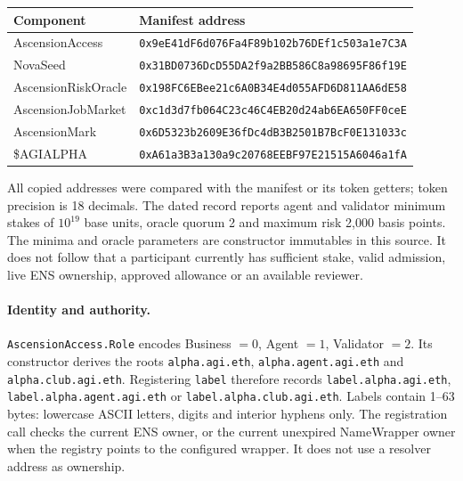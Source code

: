 \documentclass[11pt,letterpaper]{article}
\begin{document}
\begin{center}\small
\begin{tabular}{@{}ll@{}}
\toprule Component & Manifest address\\\midrule
AscensionAccess & \texttt{0x9eE41dF6d076Fa4F89b102b76DEf1c503a1e7C3A}\\
NovaSeed & \texttt{0x31BD0736DcD55DA2f9a2BB586C8a98695F86f19E}\\
AscensionRiskOracle & \texttt{0x198FC6EBee21c6A0B34E4d055AFD6D811AA6dE58}\\
AscensionJobMarket & \texttt{0xc1d3d7fb064C23c46C4EB20d24ab6EA650FF0ceE}\\
AscensionMark & \texttt{0x6D5323b2609E36fDc4dB3B2501B7BcF0E131033c}\\
\$\!AGIALPHA & \texttt{0xA61a3B3a130a9c20768EEBF97E21515A6046a1fA}\\
\bottomrule
\end{tabular}
\end{center}
All copied addresses were compared with the manifest or its token getters; token precision is 18 decimals. The dated record reports agent and validator minimum stakes of \(10^{19}\) base units, oracle quorum 2 and maximum risk 2,000 basis points. The minima and oracle parameters are constructor immutables in this source. It does not follow that a participant currently has sufficient stake, valid admission, live ENS ownership, approved allowance or an available reviewer.

\paragraph{Identity and authority.}
\texttt{AscensionAccess.\allowbreak{}Role} encodes Business \(=0\), Agent \(=1\), Validator \(=2\). Its constructor derives the roots \texttt{alpha.\allowbreak{}agi.\allowbreak{}eth}, \texttt{alpha.\allowbreak{}agent.\allowbreak{}agi.\allowbreak{}eth} and \texttt{alpha.\allowbreak{}club.\allowbreak{}agi.\allowbreak{}eth}. Registering \texttt{label} therefore records \texttt{label.\allowbreak{}alpha.\allowbreak{}agi.\allowbreak{}eth}, \texttt{label.\allowbreak{}alpha.\allowbreak{}agent.\allowbreak{}agi.\allowbreak{}eth} or \texttt{label.\allowbreak{}alpha.\allowbreak{}club.\allowbreak{}agi.\allowbreak{}eth}. Labels contain 1--63 bytes: lowercase ASCII letters, digits and interior hyphens only. The registration call checks the current ENS owner, or the current unexpired NameWrapper owner when the registry points to the configured wrapper. It does not use a resolver address as ownership.
\end{document}
